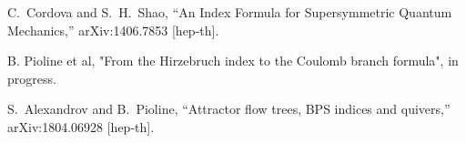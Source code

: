 \documentclass[12pt]{article}
\begin{document}
\begin{thebibliography}{9}
  C.~Cordova and S.~H.~Shao,
  ``An Index Formula for Supersymmetric Quantum Mechanics,''
  arXiv:1406.7853 [hep-th].
     
B. Pioline et al, "From the Hirzebruch index to the Coulomb branch formula", in progress.    

  S.~Alexandrov and B.~Pioline,
  ``Attractor flow trees, BPS indices and quivers,''
  arXiv:1804.06928 [hep-th].


\end{thebibliography}
\end{document}
